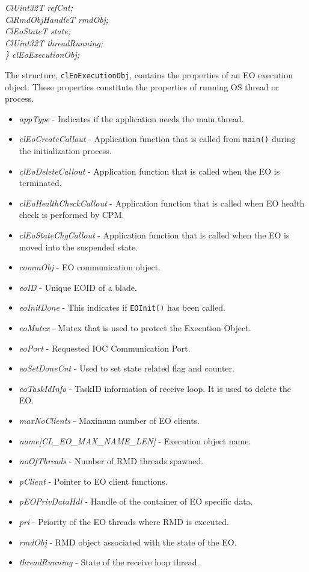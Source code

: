 \begin{flushleft}
\begin{tabbing}
\>\>\>\>\textit{ClUint32T refCnt;}\\
\>\>\>\>\textit{ClRmdObjHandleT rmdObj;}\\
\>\>\>\>\textit{ClEoStateT state;}\\
\>\>\>\>\textit{ClUint32T threadRunning;}\\
\textit{\} clEoExecutionObj;}\end{tabbing}
 The structure, {\tt{clEoExecutionObj}}, contains the properties of an EO execution object.
 These properties constitute the properties of running OS thread or process.
 \begin{itemize}
 \item
 \textit{appType} - Indicates if the application needs the main thread.
\item \textit{clEoCreateCallout} - Application function that is called from {\tt{main()}} during the initialization process.
\item \textit{clEoDeleteCallout} - Application function that is called when the EO is terminated.
\item \textit{clEoHealthCheckCallout} - Application function that is called when EO health check is
performed by CPM.
\item \textit{clEoStateChgCallout} - Application function that is called when the EO is moved into the suspended
state.
\item \textit{commObj} - EO communication object.
\item \textit{eoID} - Unique EOID of a blade.
\item \textit{eoInitDone} - This indicates if {\tt{EOInit()}} has been called.
\item \textit{eoMutex} - Mutex that is used to protect the Execution Object.
\item \textit{eoPort} - Requested IOC Communication Port.
\item \textit{eoSetDoneCnt} - Used to set state related flag and counter.
\item \textit{eoTaskIdInfo} - TaskID information of receive loop. It is used to delete the EO.
\item \textit{maxNoClients} - Maximum number of EO clients.
\item \textit{name\mbox{[}CL\_\-EO\_\-MAX\_\-NAME\_\-LEN\mbox{]}} - Execution object name.
\item \textit{noOfThreads} - Number of RMD threads spawned.
\item \textit{pClient} - Pointer to EO client functions.
\item \textit{pEOPrivDataHdl} - Handle of the container of EO specific data.
\item \textit{pri} - Priority of the EO threads where RMD is executed.
\item \textit{rmdObj} - RMD object associated with the state of the EO.
\item \textit{threadRunning} - State of the receive loop thread.
\end{itemize}




\end{flushleft}
